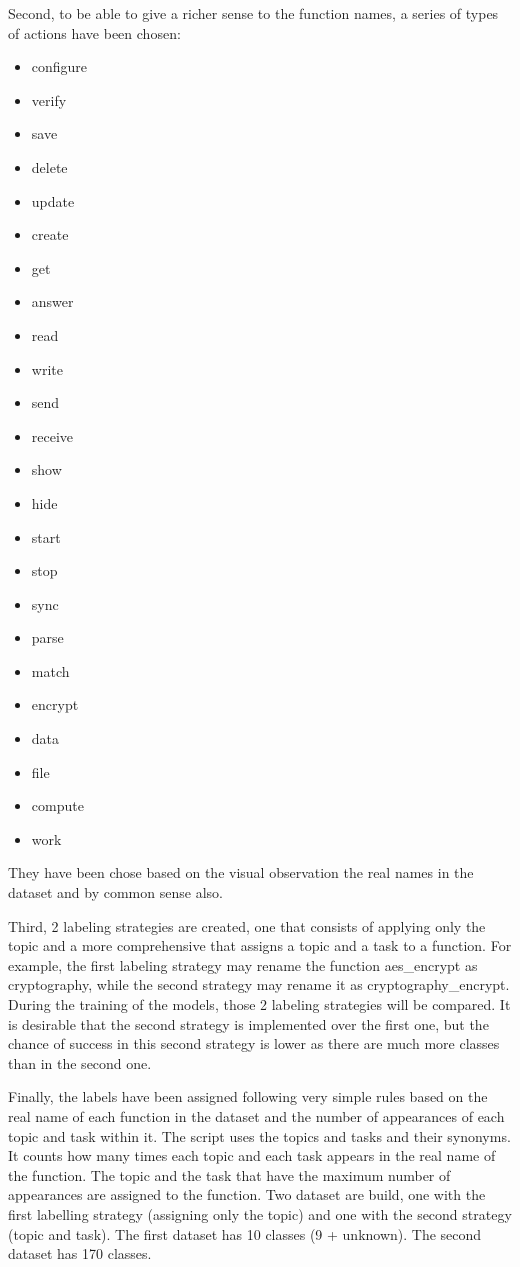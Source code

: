 \begin{appendices}
Second, to be able to give a richer sense to the function names, a series of types of actions have been chosen:
\begin{itemize}
\item configure 
\item verify
\item save
\item delete
\item update
\item create 
\item get 
\item answer
\item read
\item write
\item send
\item receive
\item show
\item hide
\item start
\item stop
\item sync
\item parse
\item match
\item encrypt
\item data
\item file
\item compute
\item work
\end{itemize}

They have been chose based on the visual observation the real names in the dataset and by common sense also.

Third, 2 labeling strategies are created, one that consists of applying only the topic and a more comprehensive that assigns a topic and a task to a function. For example, the first labeling strategy may rename the function aes\_encrypt as cryptography, while the second strategy may rename it as cryptography\_encrypt. During the training of the models, those 2 labeling strategies will be compared. It is desirable that the second strategy is implemented over the first one, but the chance of success in this second strategy is lower as there are much more classes than in the second one. 

Finally, the labels have been assigned following very simple rules based on the real name of each function in the dataset and the number of appearances of each topic and task within it. The script uses the topics and tasks and their synonyms. It counts how many times each topic and each task appears in the real name of the function. The topic and the task that have the maximum number of appearances are assigned to the function. Two dataset are build, one with the first labelling strategy (assigning only the topic) and one with the second strategy (topic and task). The first dataset has 10 classes (9 + unknown). The second dataset has 170 classes. 


\end{appendices}
